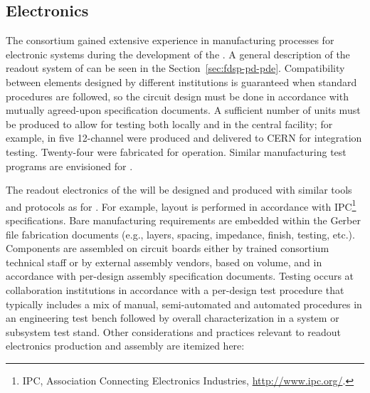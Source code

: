 \subsection{Electronics}
\label{sec:fdsp-pd-assy-pde}

The  consortium gained extensive experience in manufacturing processes for electronic systems during the development of the  .
A general description of the readout system of  can be seen in the Section~\ref{sec:fdsp-pd-pde}. Compatibility between elements designed by different institutions is guaranteed when standard procedures are followed, so the circuit design must be done in accordance with mutually agreed-upon specification documents.  A sufficient  number of units must be produced to allow %
for testing both locally and  in the central facility; for example, in  five 12-channel   were produced and delivered to CERN for integration testing. Twenty-four were fabricated for  operation. Similar manufacturing test programs are envisioned for .

The readout electronics of the  will be designed and produced with similar tools and protocols as for  . For example, %
 layout is performed in accordance with IPC\footnote{IPC\texttrademark{}, Association Connecting Electronics Industries, \url{http://www.ipc.org/}.} specifications. Bare  manufacturing requirements are embedded within the Gerber file 
fabrication documents (e.g., layers, spacing, impedance, finish, testing, etc.). Components are assembled on circuit boards either by trained  consortium technical staff or by external assembly vendors, based on volume, and in accordance with per-design assembly specification documents. Testing occurs at %
collaboration institutions in accordance with a per-design test procedure that typically includes a mix of manual, semi-automated and automated procedures %
in an engineering test bench followed by overall characterization in a system or subsystem test stand.
Other considerations and practices relevant to readout electronics production and assembly are itemized here:

